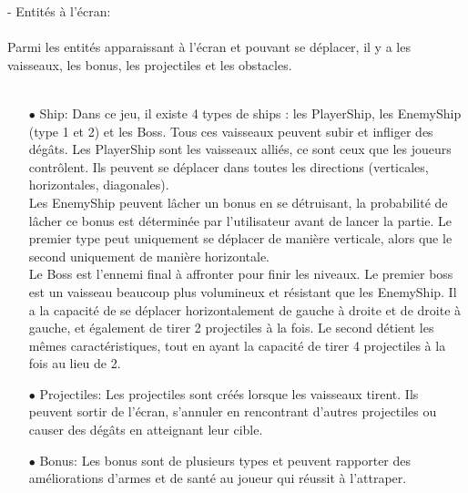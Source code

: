 \documentclass[a4paper,12pt]{article}
\begin{document}
- Entités à l’écran:\\ \\
Parmi les entités apparaissant à l’écran et pouvant se déplacer, il y a les vaisseaux, les bonus, 
les projectiles et les obstacles.\\ \\
\begin{itemize}
    \item[$\bullet$ Ship:]Dans ce jeu, il existe 4 types de ships : les PlayerShip, les EnemyShip (type 1 et 2) et les Boss. Tous ces vaisseaux peuvent subir et infliger des dégâts. Les PlayerShip sont les vaisseaux alliés, ce sont ceux que les joueurs contrôlent. Ils peuvent se déplacer dans toutes les directions (verticales, horizontales, diagonales).\\ Les EnemyShip peuvent lâcher un bonus en se détruisant, la probabilité de lâcher ce bonus est déterminée par l’utilisateur avant de lancer la partie. Le premier type peut uniquement se déplacer de manière verticale, alors que le second uniquement de manière horizontale.\\ Le Boss est l’ennemi final à affronter pour finir les niveaux. Le premier boss est un vaisseau beaucoup plus volumineux et résistant que les EnemyShip. Il a la capacité de se déplacer horizontalement de gauche à droite et de droite à gauche, et également de tirer 2 projectiles à la fois. Le second détient les mêmes caractéristiques, tout en ayant la capacité de tirer 4 projectiles à la fois au lieu de 2.\\ 

    \item[$\bullet$ Projectiles:]Les projectiles sont créés lorsque les vaisseaux tirent. Ils peuvent sortir de l’écran, s’annuler en rencontrant d’autres projectiles ou causer des dégâts en atteignant leur cible.\\

    \item[$\bullet$ Bonus:]Les bonus sont de plusieurs types et peuvent rapporter des améliorations d’armes et de santé au joueur qui réussit à l'attraper.
\end{itemize}
\newpage
\end{document}
